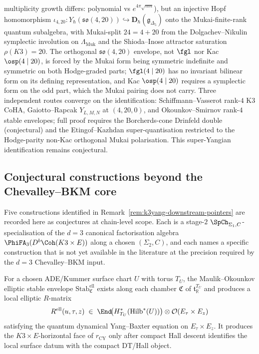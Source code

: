 \begin{remark}
multiplicity growth differs: polynomial vs $e^{4\pi\sqrt{nm}}$), but
an injective Hopf homomorphism
$\iota_{4, 20}\colon Y_\hbar(\mathfrak{so}(4, 20))\hookrightarrow
\mathbf D_\hbar(\mathfrak g_{\Delta_5})$ onto the Mukai-finite-rank
quantum subalgebra, with Mukai-split $24 = 4 + 20$ from the
Dolgachev--Nikulin symplectic involution on $\Lambda_{\mathrm{Muk}}$
and the Shioda--Inose attractor saturation $\rho(K3) = 20$. The
orthogonal $\mathfrak{so}(4, 20)$ envelope, not $\fgl$ nor Kac
$\osp(4 \mid 20)$, is forced by the Mukai form being symmetric
indefinite and symmetric on both Hodge-graded parts;
$\fgl(4 \mid 20)$ has no invariant bilinear form on its defining
representation, and Kac $\osp(4 \mid 20)$ requires a symplectic
form on the odd part, which the Mukai pairing does not carry.
Three independent routes converge on the identification:
Schiffmann--Vasserot rank-$4$ K3 CoHA, Gaiotto--Rapcak $Y_{L,M,N}$
at $(4,20,0)$, and Okounkov--Smirnov rank-$4$ stable envelopes; full
proof requires the Borcherds-cone Drinfeld double (conjectural) and
the Etingof--Kazhdan super-quantisation restricted to the
Hodge-parity non-Kac orthogonal Mukai polarisation. This super-Yangian
identification remains conjectural.
\end{remark}

\subsection{Conjectural constructions beyond the Chevalley--BKM core}
\label{subsec:k3y-conjectural-programme-items}

Five constructions identified in
Remark~\ref{rem:k3yang-downstream-pointers} are recorded here as
conjectures at chain-level scope. Each is a stage-$2$
$\SpCh_{\Sigma_1,C}$-specialisation of the $d=3$ canonical
factorisation algebra $\PhiFA_3(D^b\Coh(K3\times E))$ along a chosen
$(\Sigma_2,C)$, and each names a specific construction that is not yet
available in the literature at the
precision required by the $d=3$ Chevalley--BKM input.

\begin{conjecture}
\label{conj:k3y-mo-elliptic-stable-envelopes-programme}
\ClaimStatusConjectured
For a chosen ADE/Kummer surface chart \(U\) with torus \(T_U\), the
Maulik--Okounkov elliptic stable envelope
\(\mathrm{Stab}^{\mathrm{ell}}_{\mathfrak C}\) exists along each chamber
\(\mathfrak C\) of \(\mathfrak t_{\mathbb R}^{T_U}\) and produces a local
elliptic $R$-matrix
\[
 R^{\mathrm{ell}}(u,\tau,z)
 \;\in\;
 \End\!\bigl(H^*_{T_U}(\mathrm{Hilb}^*(U))\bigr)
 \otimes \mathcal O(E_\tau \times E_z)
\]
satisfying the quantum dynamical Yang--Baxter equation on
\(E_\tau\times E_z\). It produces the \(K3\times E\)-horizontal face of
\(r_{\mathrm{CY}}\) only after compact Hall descent identifies the local
surface datum with the compact DT/Hall object.
\end{conjecture}

